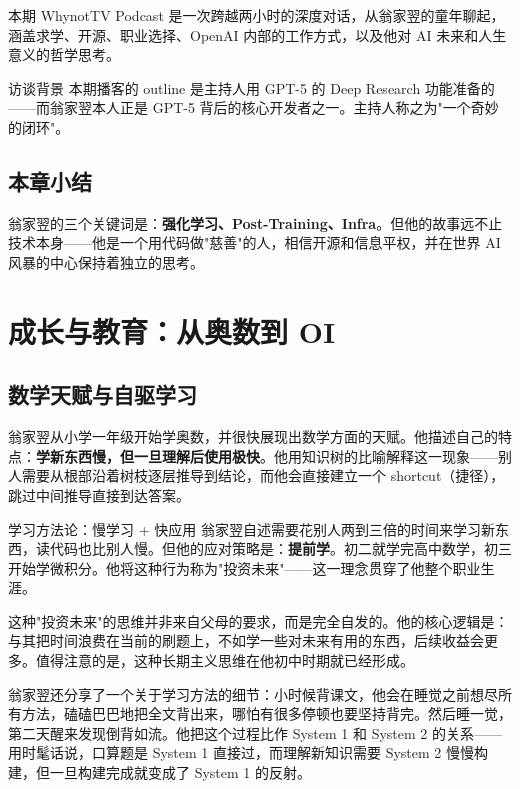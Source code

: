 \documentclass[a4paper]{article}
\begin{document}
本期 WhynotTV Podcast 是一次跨越两小时的深度对话，从翁家翌的童年聊起，涵盖求学、开源、职业选择、OpenAI 内部的工作方式，以及他对 AI 未来和人生意义的哲学思考。

\begin{knowledgebox}{访谈背景}
本期播客的 outline 是主持人用 GPT-5 的 Deep Research 功能准备的——而翁家翌本人正是 GPT-5 背后的核心开发者之一。主持人称之为"一个奇妙的闭环"。
\end{knowledgebox}

\subsection{本章小结}

翁家翌的三个关键词是：\textbf{强化学习、Post-Training、Infra}。但他的故事远不止技术本身——他是一个用代码做"慈善"的人，相信开源和信息平权，并在世界 AI 风暴的中心保持着独立的思考。


\section{成长与教育：从奥数到 OI}

\subsection{数学天赋与自驱学习}

翁家翌从小学一年级开始学奥数，并很快展现出数学方面的天赋。他描述自己的特点：\textbf{学新东西慢，但一旦理解后使用极快}。他用知识树的比喻解释这一现象——别人需要从根部沿着树枝逐层推导到结论，而他会直接建立一个 shortcut（捷径），跳过中间推导直接到达答案。

\begin{importantbox}{学习方法论：慢学习 + 快应用}
翁家翌自述需要花别人两到三倍的时间来学习新东西，读代码也比别人慢。但他的应对策略是：\textbf{提前学}。初二就学完高中数学，初三开始学微积分。他将这种行为称为"投资未来"——这一理念贯穿了他整个职业生涯。
\end{importantbox}

这种"投资未来"的思维并非来自父母的要求，而是完全自发的。他的核心逻辑是：与其把时间浪费在当前的刷题上，不如学一些对未来有用的东西，后续收益会更多。值得注意的是，这种长期主义思维在他初中时期就已经形成。

翁家翌还分享了一个关于学习方法的细节：小时候背课文，他会在睡觉之前想尽所有方法，磕磕巴巴地把全文背出来，哪怕有很多停顿也要坚持背完。然后睡一觉，第二天醒来发现倒背如流。他把这个过程比作 System 1 和 System 2 的关系——用时髦话说，口算题是 System 1 直接过，而理解新知识需要 System 2 慢慢构建，但一旦构建完成就变成了 System 1 的反射。
\end{document}
